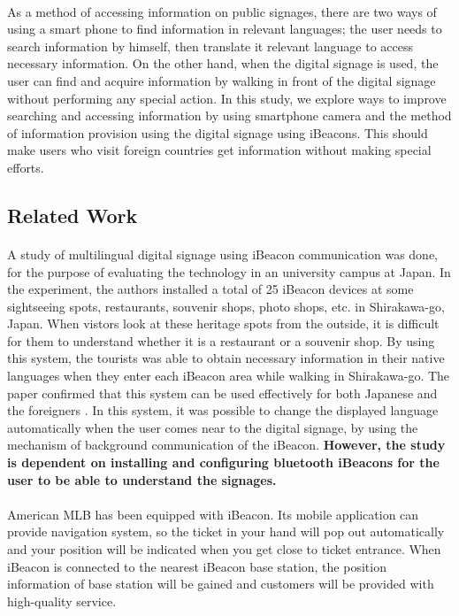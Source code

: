 \documentclass[12pt]{article}
\begin{document}
\paragraph{}As a method of accessing information on public signages, there are two ways of using a smart phone to find information in relevant languages; the user needs to search information by himself, then translate it relevant language to access necessary information. On the other hand, when the digital signage is used, the user can find and acquire information by walking in front of the digital signage without performing any special action. In this study, we explore ways to improve searching and accessing information by using smartphone camera and the method of information provision using the digital signage using iBeacons. This should make users who visit foreign countries get information without making special efforts. 

\subsection{Related Work}

\paragraph{} A study of multilingual digital signage using iBeacon communication was done, for the purpose of evaluating the technology in an university campus at Japan.  \cite{one} In the experiment, the authors installed a total of 25 iBeacon devices at some sightseeing spots, restaurants, souvenir shops, photo shops, etc. in Shirakawa-go, Japan. When vistors look at these heritage spots from the outside, it is difficult for them to understand whether it is a restaurant or a souvenir shop. By using this system, the tourists was able to obtain necessary information in their native languages when they enter each iBeacon area while walking in Shirakawa-go. The paper confirmed that this system can be used effectively for both Japanese and the foreigners \cite{one}.  In this system, it was possible to change the displayed language automatically when the user comes near to the digital signage, by using the mechanism of background communication of the iBeacon. \textbf{However, the study is dependent on installing and configuring bluetooth iBeacons for the user to be able to understand the signages.}

\paragraph{}American MLB has been equipped with iBeacon. Its mobile application can provide navigation system, so the ticket in your hand will pop out automatically and your position will be indicated when you get close to ticket entrance. When iBeacon is connected to the nearest iBeacon base station, the position information of base station will be gained and customers will be provided with high-quality service.\cite{taiwan}
\end{document}
